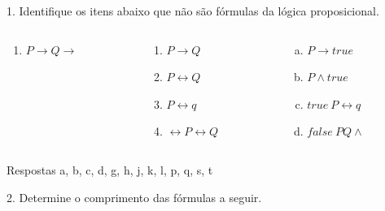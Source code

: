 \documentclass[10pt, headsepline, captions=tableabove,xcolor=table]{beamer}
\begin{document}
\begin{frame}[t]
\begin{exampleblock}{1. Identifique os itens abaixo que não são fórmulas da lógica proposicional.}
\begin{columns}[T]
\begin{column}{0.20\textwidth}
\begin{enumerate}[\bf a.]
                    \item $P \rightarrow Q \rightarrow $
                \end{enumerate}
            \end{column}
            \hspace*{-7mm}
            \begin{column}{0.2\textwidth}
                \begin{enumerate}[\bf a.]
                    \addtocounter{enumi}{12}
                    \item $P \rightarrow Q$
                    \item $P \leftrightarrow Q$
                    \item $P \leftrightarrow q$
                    \item $\leftrightarrow P \leftrightarrow Q$
                \end{enumerate}
            \end{column}
            \hspace*{-8mm}
            \begin{column}{0.25\textwidth}
                \begin{enumerate}[a.]
                    \addtocounter{enumi}{16}
                    \item $P \rightarrow true$
                    \item $P \land true$
                    \item $true~P \leftrightarrow q$
                    \item $false~PQ \land$
                \end{enumerate}
            \end{column}
        \end{columns}
    \end{exampleblock}
    \pause
    \vspace{-2mm}
    \begin{alertblock}{Respostas}
        a, b, c, d, g, h, j, k, l, p, q, s, t
    \end{alertblock}
    \pause
    \vspace{-2mm}
    \begin{exampleblock}{2. Determine o comprimento das fórmulas a seguir.}
        \begin{columns}[T]
            \begin{column}{0.8\textwidth}

\end{column}
\end{columns}
\end{exampleblock}
\end{frame}
\end{document}
